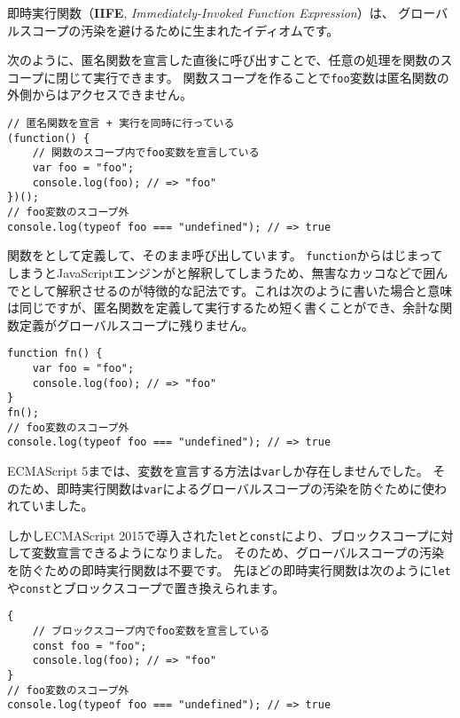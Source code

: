 \begin{tcolorbox}[enhanced jigsaw,breakable,title=即時実行関数]\label{immediate-function}

即時実行関数（\textbf{IIFE}, \emph{Immediately-Invoked Function
Expression}）は、
グローバルスコープの汚染を避けるために生まれたイディオムです。

次のように、匿名関数を宣言した直後に呼び出すことで、任意の処理を関数のスコープに閉じて実行できます。
関数スコープを作ることで\texttt{foo}変数は匿名関数の外側からはアクセスできません。

\begin{lstlisting}
// 匿名関数を宣言 + 実行を同時に行っている
(function() {
    // 関数のスコープ内でfoo変数を宣言している
    var foo = "foo";
    console.log(foo); // => "foo"
})();
// foo変数のスコープ外
console.log(typeof foo === "undefined"); // => true
\end{lstlisting}

関数を\textbf{}として定義して、そのまま呼び出しています。
\texttt{function}からはじまってしまうとJavaScriptエンジンが\textbf{}と解釈してしまうため、無害なカッコなどで囲んで\textbf{}として解釈させるのが特徴的な記法です。これは次のように書いた場合と意味は同じですが、匿名関数を定義して実行するため短く書くことができ、余計な関数定義がグローバルスコープに残りません。

\begin{lstlisting}
function fn() {
    var foo = "foo";
    console.log(foo); // => "foo"
}
fn();
// foo変数のスコープ外
console.log(typeof foo === "undefined"); // => true
\end{lstlisting}

ECMAScript 5までは、変数を宣言する方法は\texttt{var}しか存在しませんでした。
そのため、即時実行関数は\texttt{var}によるグローバルスコープの汚染を防ぐために使われていました。

しかしECMAScript
2015で導入された\texttt{let}と\texttt{const}により、ブロックスコープに対して変数宣言できるようになりました。
そのため、グローバルスコープの汚染を防ぐための即時実行関数は不要です。
先ほどの即時実行関数は次のように\texttt{let}や\texttt{const}とブロックスコープで置き換えられます。

\begin{lstlisting}
{
    // ブロックスコープ内でfoo変数を宣言している
    const foo = "foo";
    console.log(foo); // => "foo"
}
// foo変数のスコープ外
console.log(typeof foo === "undefined"); // => true
\end{lstlisting}
\end{tcolorbox}

